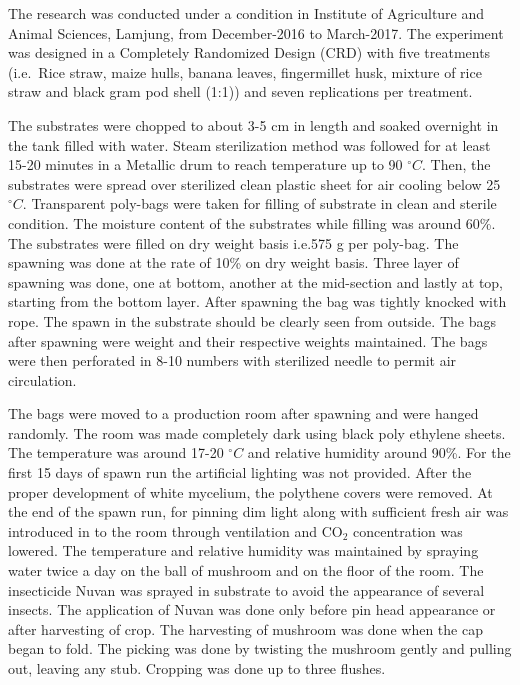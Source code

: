 \documentclass[]{elsarticle} %
\begin{document}
The research was conducted under a condition in Institute of Agriculture
and Animal Sciences, Lamjung, from December-2016 to March-2017. The
experiment was designed in a Completely Randomized Design (CRD) with
five treatments (i.e.~Rice straw, maize hulls, banana leaves,
fingermillet husk, mixture of rice straw and black gram pod shell (1:1))
and seven replications per treatment.

The substrates were chopped to about 3-5 cm in length and soaked
overnight in the tank filled with water. Steam sterilization method was
followed for at least 15-20 minutes in a Metallic drum to reach
temperature up to 90 \(^\circ C\). Then, the substrates were spread over
sterilized clean plastic sheet for air cooling below 25 \(^\circ C\).
Transparent poly-bags were taken for filling of substrate in clean and
sterile condition. The moisture content of the substrates while filling
was around 60\%. The substrates were filled on dry weight basis i.e.575
g per poly-bag. The spawning was done at the rate of 10\% on dry weight
basis. Three layer of spawning was done, one at bottom, another at the
mid-section and lastly at top, starting from the bottom layer. After
spawning the bag was tightly knocked with rope. The spawn in the
substrate should be clearly seen from outside. The bags after spawning
were weight and their respective weights maintained. The bags were then
perforated in 8-10 numbers with sterilized needle to permit air
circulation.

The bags were moved to a production room after spawning and were hanged
randomly. The room was made completely dark using black poly ethylene
sheets. The temperature was around 17-20 \(^\circ C\) and relative
humidity around 90\%. For the first 15 days of spawn run the artificial
lighting was not provided. After the proper development of white
mycelium, the polythene covers were removed. At the end of the spawn
run, for pinning dim light along with sufficient fresh air was
introduced in to the room through ventilation and \(\mathrm{CO_2}\)
concentration was lowered. The temperature and relative humidity was
maintained by spraying water twice a day on the ball of mushroom and on
the floor of the room. The insecticide Nuvan was sprayed in substrate to
avoid the appearance of several insects. The application of Nuvan was
done only before pin head appearance or after harvesting of crop. The
harvesting of mushroom was done when the cap began to fold. The picking
was done by twisting the mushroom gently and pulling out, leaving any
stub. Cropping was done up to three flushes.
\end{document}
